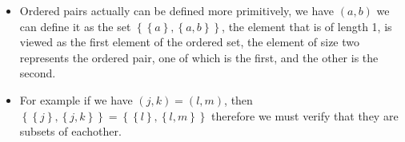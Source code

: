 \documentclass[11pt]{book}
\begin{document}
\begin{itemize}
    \item Ordered pairs actually can be defined more primitively, we have $\left( a,b  \right) $ we can define it as the set $\left\{ \left\{ a \right\} , \left\{ a, b \right\}  \right\} $, the element that is of length 1, is viewed as the first element of the ordered set, the element of size two represents the ordered pair, one of which is the first, and the other is the second. 
    \item For example if we have $\left( j, k  \right) = \left( l, m \right)$, then $\left\{ \left\{ j \right\} , \left\{ j, k \right\}  \right\} = \left\{ \left\{ l \right\} , \left\{ l, m \right\}  \right\} $ therefore we must verify that they are subsets of eachother. 
\end{itemize}





\end{document}
